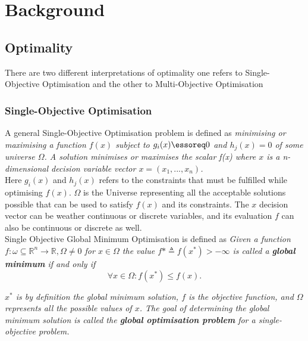 \chapter{Background}
\label{chapter:chapter02}

\section{Optimality}

There are two different interpretations of optimality one refers to Single-Objective Optimisation and the other to Multi-Objective Optimisation\\

\subsection{Single-Objective Optimisation}

A general Single-Objective Optimisation problem is defined as \textit{minimising or maximising a function $f(x)$ subject to $g_i(x) \essoreq 0$ and $h_j(x) = 0$ of some universe $\Omega$. A solution minimises or maximises the scalar f(x) where $x$ is a n-dimensional decision variable vector $x = (x_1,...,x_n)$.}\\

Here $g_i(x)$ and $h_j(x)$ refers to the constraints that must be fulfilled while optimising $f(x)$. $\Omega$ is the Universe representing all the acceptable solutions possible that can be used to satisfy $f(x)$ and its constraints. The $x$ decision vector can be weather continuous or discrete variables, and its evaluation $f$ can also be continuous or discrete as well.\\

Single Objective Global Minimum Optimisation is defined as \textit{Given a function $f: \omega \subseteq \mathbb{R}^n \rightarrow \mathbb{R}, \Omega \neq 0$ for $x \in \Omega$ the value $f* \triangleq f(x^*) > -\infty$ is called a \textbf{global minimum} if and only if}\\

\begin{equation}
    \forall x \in \Omega: f(x^*) \leq f(x).
\end{equation}

\textit{$x^*$ is by definition the global minimum solution, $f$ is the objective function, and $\Omega$ represents all the possible values of $x$. The goal of determining the global minimum solution is called the \textbf{global optimisation problem} for a single-objective problem.}\\

